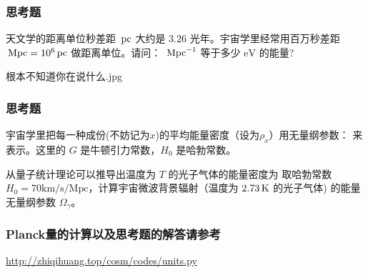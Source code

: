 \documentclass[CJK,13pt]{beamer}
\begin{document}
\begin{frame}
\frametitle{ 思考题 }

天文学的距离单位秒差距 $\,\mathrm{pc}$ 大约是 $3.26$ 光年。宇宙学里经常用百万秒差距 $\,\mathrm{Mpc} = 10^6\,\mathrm{pc}$ 做距离单位。请问： $\,\mathrm{Mpc}^{-1}$ 等于多少 $\mathrm{eV}$ 的能量?

\bcenter
{}

根本不知道你在说什么.jpg
\ecenter

\end{frame}



\begin{frame}
  \frametitle{思考题}
  宇宙学里把每一种成份(不妨记为$x$)的平均能量密度（设为$\rho_x$）用无量纲参数：
  来表示。这里的 $G$ 是牛顿引力常数，$H_0$ 是哈勃常数。

  \skipline
  
  从量子统计理论可以推导出温度为 $T$ 的光子气体的能量密度为
  取哈勃常数 $H_0=70\mathrm{km/s/Mpc}$，计算宇宙微波背景辐射（温度为 $2.73\,\mathrm{K}$ 的光子气体) 的能量无量纲参数 $\Omega_\gamma$。
\end{frame}

\begin{frame}
  \frametitle{Planck量的计算以及思考题的解答请参考}
  
    
  \url{http://zhiqihuang.top/cosm/codes/units.py}
\end{frame}

\ech
\end{document}
